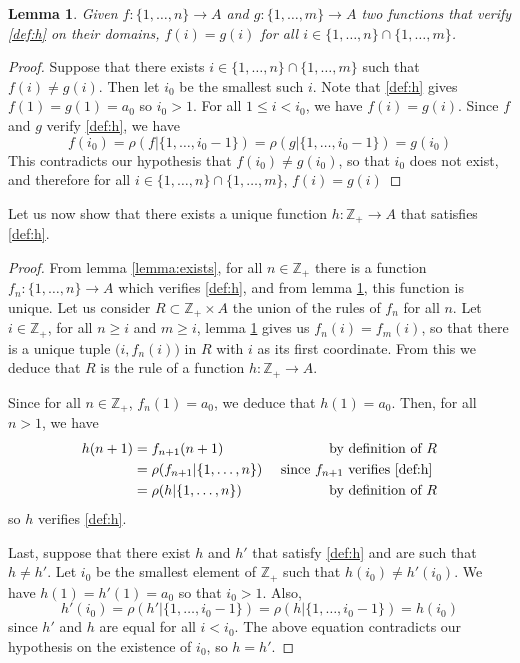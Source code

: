 \documentclass[11pt,a4paper,twoside]{article}
\theoremstyle{definition}
\theoremstyle{plain}
\newtheorem{lemma}{Lemma}
\begin{document}
\begin{lemma} \label{lemma:unique}
  Given $f : \{ 1, \dotsc, n \} \to A$ and $g : \{ 1, \dotsc, m \} \to A$ two functions that verify \eqref{def:h} on their domains,
  $f (i) = g (i)$ for all $i \in \{ 1, \dotsc, n \} \cap \{ 1, \dotsc, m \}$.
\end{lemma}
\begin{proof}
  Suppose that there exists $i \in \{ 1, \dotsc, n \} \cap \{ 1, \dotsc, m \}$ such that $f (i) \neq g (i)$. Then let $i_0$ be the smallest such $i$.
  Note that \eqref{def:h} gives $f (1) = g (1) = a_0$ so $i_0 > 1$. For all $1 \leq i < i_0$,
  we have $f (i) = g (i)$. Since $f$ and $g$ verify \eqref{def:h}, we have
  \begin{equation*}
    f (i_0) = \rho ( f | \{ 1, \dotsc, i_0 - 1 \} ) = \rho ( g | \{ 1, \dotsc, i_0 - 1 \} ) = g (i_0)
  \end{equation*}
  This contradicts our hypothesis that $f (i_0) \neq g (i_0)$, so that $i_0$ does not exist,
  and therefore for all $i \in \{ 1, \dotsc, n \} \cap \{ 1, \dotsc, m \}$, $f (i) = g (i)$
\end{proof}

Let us now show that there exists a unique function $h : \mathbb{Z}_+ \to A$ that satisfies \eqref{def:h}.

\begin{proof}
  From lemma \ref{lemma:exists}, for all $n \in \mathbb{Z}_+$ there is a function $f_n : \{ 1, \dotsc, n \} \to A$ which verifies \eqref{def:h},
  and from lemma \ref{lemma:unique}, this function is unique. Let us consider $R \subset \mathbb{Z}_+ \times A$ the union of the rules of $f_n$ for all $n$.
  Let $i \in \mathbb{Z}_+$, for all $n \geq i$ and $m \geq i$, lemma \ref{lemma:unique} gives us $f_n (i) = f_m (i)$, so that there is
  a unique tuple $\big(i, f_n (i) \big)$ in $R$ with $i$ as its first coordinate. From this we deduce that $R$ is the rule of a function
  $h : \mathbb{Z}_+ \to A$.

  Since for all $n \in \mathbb{Z}_+$, $f_n (1) = a_0$, we deduce that $h (1) = a_0$. Then, for all $n > 1$, we have
  \begin{align*}
    h (n + 1) &= f_{n + 1} (n + 1)  &\text{ by definition of } R \\
    &= \rho ( f_{n + 1} | \{ 1, \dotsc, n \} ) &\text{ since } f_{n + 1} \text{ verifies \eqref{def:h} } \\
    &= \rho ( h | \{ 1, \dotsc, n \} ) &\text{ by definition of } R
  \end{align*}
  so $h$ verifies \eqref{def:h}.

  Last, suppose that there exist $h$ and $h'$ that satisfy \eqref{def:h} and are such that $h \neq h'$. Let $i_0$ be the smallest element of $\mathbb{Z}_+$
  such that $h (i_0) \neq h' (i_0)$. We have $h (1) = h' (1) = a_0$ so that $i_0 > 1$. Also,
  \begin{equation*}
    h' (i_0) = \rho ( h' | \{ 1, \dotsc, i_0 - 1 \} ) = \rho ( h | \{ 1, \dotsc, i_0 - 1 \} ) = h (i_0)
  \end{equation*}
  since $h'$ and $h$ are equal for all $i < i_0$. The above equation contradicts our hypothesis on the existence of $i_0$, so $h = h'$.

\end{proof}
\end{document}
